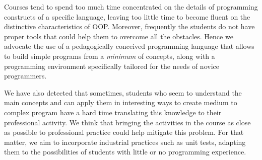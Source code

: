 
Courses tend to spend too much time concentrated on the details of programming constructs of a specific language, leaving too little time to become fluent on the distinctive characteristics of OOP. 
Moreover, frequently the students do not have proper tools that could help them to overcome all the obstacles.
Hence we advocate the use of a pedagogically conceived programming language that allows to build simple programs from a \emph{minimum} of concepts, along with a programming environment specifically tailored for the needs of novice programmers.

\medskip




We have also detected that sometimes, students who seem to understand the main concepts and can apply them in interesting ways to create medium to complex program have a hard time translating this knowledge to their professional activity.
We think that bringing the activities in the course as close as possible to professional practice could help mitigate this problem.
For that matter, we aim to incorporate industrial practices such as 
unit tests, adapting them to the possibilities of students with little or no programming experience.

